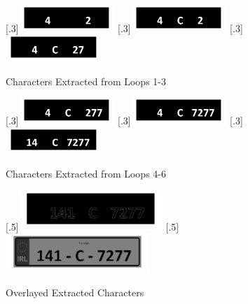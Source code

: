 \documentclass[a4paper]{article}
\begin{document}
	\begin{figure}[H]
		\centering
		[.3\linewidth]{\includegraphics[height=1cm]{Results/Q2/NumPlate4/qanumber_plate_4Added1.jpg}}%
		[.3\linewidth]{\includegraphics[height=1cm]{Results/Q2/NumPlate4/qanumber_plate_4Added2.jpg}}%
		[.3\linewidth]{\includegraphics[height=1cm]{Results/Q2/NumPlate4/qanumber_plate_4Added3.jpg}}%
		\caption{Characters Extracted from Loops 1-3}
		\label{fig:}
	\end{figure}
	\begin{figure}[H]
		\centering
		[.3\linewidth]{\includegraphics[height=1cm]{Results/Q2/NumPlate4/qanumber_plate_4Added4.jpg}}%
		[.3\linewidth]{\includegraphics[height=1cm]{Results/Q2/NumPlate4/qanumber_plate_4Added5.jpg}}%
		[.3\linewidth]{\includegraphics[height=1cm]{Results/Q2/NumPlate4/qanumber_plate_4Added6.jpg}}%
		\caption{Characters Extracted from Loops 4-6}
		\label{fig:}
	\end{figure}
	\begin{figure}[H]
		\centering
		[.5\linewidth]{\includegraphics[height=1.5cm]{Results/Q2/NumPlate4/qanumber_plate_4Canny.jpg}}%
		[.5\linewidth]{\includegraphics[height=1.5cm]{Results/Q2/NumPlate4/qanumber_plate_4Overlay.jpg}}%
		\caption{Overlayed Extracted Characters}
		\label{fig:}
	\end{figure}
\end{document}
